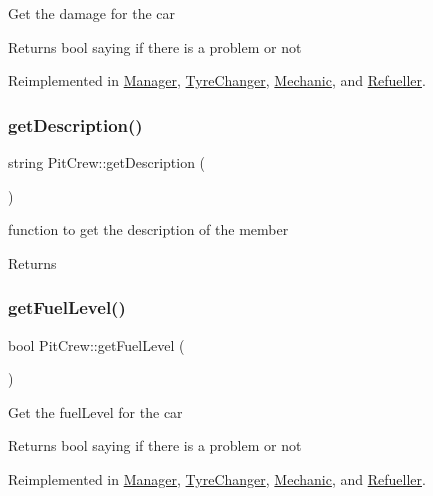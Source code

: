 Get the damage for the car \begin{DoxyReturn}{Returns}
bool saying if there is a problem or not 
\end{DoxyReturn}


Reimplemented in \mbox{\hyperlink{class_manager_a4f22d596754a0a099c9b467eadcb408f}{Manager}}, \mbox{\hyperlink{class_tyre_changer_ac0ad98b08d6016010a6bfed58442b78c}{Tyre\+Changer}}, \mbox{\hyperlink{class_mechanic_a6a67e4933d517b8e0a78763d80c82fd8}{Mechanic}}, and \mbox{\hyperlink{class_refueller_a60e223f847141196f4b44656869b06d1}{Refueller}}.

\mbox{\label{class_pit_crew_ad30e9eabf7e52b6a459b8a4816e43909}} 
\subsubsection{\texorpdfstring{get\+Description()}{getDescription()}}
{\footnotesize\ttfamily string Pit\+Crew\+::get\+Description (\begin{DoxyParamCaption}{ }\end{DoxyParamCaption})}

function to get the description of the member \begin{DoxyReturn}{Returns}

\end{DoxyReturn}
\mbox{\label{class_pit_crew_a6960d91ce635df7f846301e21ae64450}} 
\subsubsection{\texorpdfstring{get\+Fuel\+Level()}{getFuelLevel()}}
{\footnotesize\ttfamily bool Pit\+Crew\+::get\+Fuel\+Level (\begin{DoxyParamCaption}{ }\end{DoxyParamCaption})\hspace{0.3cm}{\ttfamily [virtual]}}

Get the fuel\+Level for the car \begin{DoxyReturn}{Returns}
bool saying if there is a problem or not 
\end{DoxyReturn}


Reimplemented in \mbox{\hyperlink{class_manager_a832a35309c0a23038f2fc94879e2dab8}{Manager}}, \mbox{\hyperlink{class_tyre_changer_ad369d1e8e5e356b297c904be374b045c}{Tyre\+Changer}}, \mbox{\hyperlink{class_mechanic_a0479343f19d2ea34942e3c3bd0b14391}{Mechanic}}, and \mbox{\hyperlink{class_refueller_afa17784be5e98b518c3a7de2d3b7ad1f}{Refueller}}.

